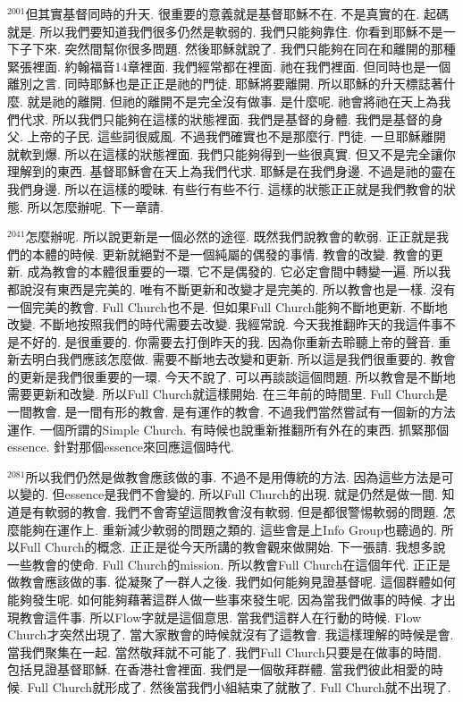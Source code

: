 \documentclass{book}
\begin{document}
$^{2001}$但其實基督同時的升天.
很重要的意義就是基督耶穌不在.
不是真實的在.
起碼就是.
所以我們要知道我們很多仍然是軟弱的.
我們只能夠靠住.
你看到耶穌不是一下子下來.
突然間幫你很多問題.
然後耶穌就說了.
我們只能夠在同在和離開的那種緊張裡面.
約翰福音14章裡面.
我們經常都在裡面.
祂在我們裡面.
但同時也是一個離別之言.
同時耶穌也是正正是祂的門徒.
耶穌將要離開.
所以耶穌的升天標誌著什麼.
就是祂的離開.
但祂的離開不是完全沒有做事.
是什麼呢.
祂會將祂在天上為我們代求.
所以我們只能夠在這樣的狀態裡面.
我們是基督的身體.
我們是基督的身父.
上帝的子民.
這些詞很威風.
不過我們確實也不是那麼行.
門徒.
一旦耶穌離開就軟到爆.
所以在這樣的狀態裡面.
我們只能夠得到一些很真實.
但又不是完全讓你理解到的東西.
基督耶穌會在天上為我們代求.
耶穌是在我們身邊.
不過是祂的靈在我們身邊.
所以在這樣的曖昧.
有些行有些不行.
這樣的狀態正正就是我們教會的狀態.
所以怎麼辦呢.
下一章請.

$^{2041}$怎麼辦呢.
所以說更新是一個必然的途徑.
既然我們說教會的軟弱.
正正就是我們的本體的時候.
更新就絕對不是一個純屬的偶發的事情.
教會的改變.
教會的更新.
成為教會的本體很重要的一環.
它不是偶發的.
它必定會間中轉變一遍.
所以我都說沒有東西是完美的.
唯有不斷更新和改變才是完美的.
所以教會也是一樣.
沒有一個完美的教會.
Full Church也不是.
但如果Full Church能夠不斷地更新.
不斷地改變.
不斷地按照我們的時代需要去改變.
我經常說.
今天我推翻昨天的我這件事不是不好的.
是很重要的.
你需要去打倒昨天的我.
因為你重新去聆聽上帝的聲音.
重新去明白我們應該怎麼做.
需要不斷地去改變和更新.
所以這是我們很重要的.
教會的更新是我們很重要的一環.
今天不說了.
可以再談談這個問題.
所以教會是不斷地需要更新和改變.
所以Full Church就這樣開始.
在三年前的時間里.
Full Church是一間教會.
是一間有形的教會.
是有運作的教會.
不過我們當然嘗試有一個新的方法運作.
一個所謂的Simple Church.
有時候也說重新推翻所有外在的東西.
抓緊那個essence.
針對那個essence來回應這個時代.

$^{2081}$所以我們仍然是做教會應該做的事.
不過不是用傳統的方法.
因為這些方法是可以變的.
但essence是我們不會變的.
所以Full Church的出現.
就是仍然是做一間.
知道是有軟弱的教會.
我們不會寄望這間教會沒有軟弱.
但是都很警惕軟弱的問題.
怎麼能夠在運作上.
重新減少軟弱的問題之類的.
這些會是上Info Group也聽過的.
所以Full Church的概念.
正正是從今天所講的教會觀來做開始.
下一張請.
我想多說一些教會的使命.
Full Church的mission.
所以教會Full Church在這個年代.
正正是做教會應該做的事.
從凝聚了一群人之後.
我們如何能夠見證基督呢.
這個群體如何能夠發生呢.
如何能夠藉著這群人做一些事來發生呢.
因為當我們做事的時候.
才出現教會這件事.
所以Flow字就是這個意思.
當我們這群人在行動的時候.
Flow Church才突然出現了.
當大家散會的時候就沒有了這教會.
我這樣理解的時候是會.
當我們聚集在一起.
當然敬拜就不可能了.
我們Full Church只要是在做事的時間.
包括見證基督耶穌.
在香港社會裡面.
我們是一個敬拜群體.
當我們彼此相愛的時候.
Full Church就形成了.
然後當我們小組結束了就散了.
Full Church就不出現了.
\end{document}
